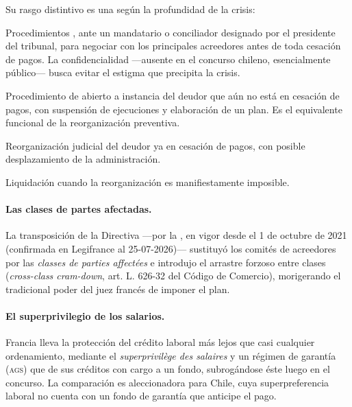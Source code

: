Su rasgo distintivo es una  según la profundidad de la crisis:

\begin{description}[leftmargin=0pt,style=nextline,font=\sffamily\bfseries]
  \item[Mandat ad hoc y conciliation] Procedimientos , ante
  un mandatario o conciliador designado por el presidente del tribunal, para negociar con los
  principales acreedores antes de toda cesación de pagos. La confidencialidad ---ausente en el
  concurso chileno, esencialmente público--- busca evitar el estigma que precipita la crisis.
  \item[Sauvegarde] Procedimiento de  abierto a instancia del deudor que aún
  no está en cesación de pagos, con suspensión de ejecuciones y elaboración de un plan. Es el
  equivalente funcional de la reorganización preventiva.
  \item[Redressement judiciaire] Reorganización judicial del deudor ya en cesación de pagos, con
  posible desplazamiento de la administración.
  \item[Liquidation judiciaire] Liquidación cuando la reorganización es manifiestamente imposible.
\end{description}

\paragraph{Las clases de partes afectadas.} La transposición de la Directiva ---por la
, en vigor desde
el 1 de octubre de 2021 (confirmada en Legifrance al 25-07-2026)--- sustituyó los comités de
acreedores por las \emph{classes de parties affectées} e introdujo el arrastre forzoso entre clases
(\emph{cross-class cram-down}, art. L. 626-32 del Código de Comercio), morigerando el tradicional
poder del juez francés de imponer el plan.

\paragraph{El superprivilegio de los salarios.} Francia lleva la protección del crédito laboral más
lejos que casi cualquier ordenamiento, mediante el \emph{superprivilège des salaires} y un régimen
de garantía (\textsc{ags}) que  de sus créditos con
cargo a un fondo, subrogándose éste luego en el concurso. La comparación es aleccionadora para
Chile, cuya superpreferencia laboral no cuenta con un fondo de garantía que anticipe el pago.

